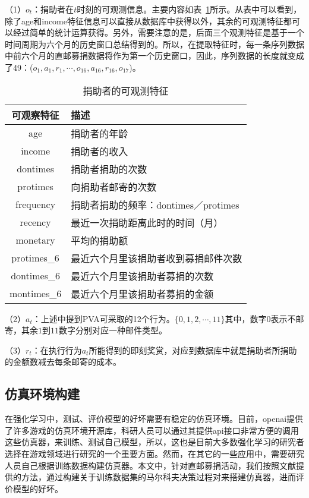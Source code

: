 （1）$o_{t}$：捐助者在$t$时刻的可观测信息。主要内容如表~\ref{tab:obser_donors}所示。从表中可以看到，除了age和income特征信息可以直接从数据库中获得以外，其余的可观测特征都可以经过简单的统计运算获得。另外，需要注意的是，后面三个观测特征是基于一个时间周期为六个月的历史窗口总结得到的。所以，在提取特征时，每一条序列数据中前六个月的直邮募捐数据将作为第一个历史窗口，因此，序列数据的长度就变成了49：($o_{1}, a_{1}, r_{1},\cdots,o_{16}, a_{16}, r_{16}, o_{17}$)。
\begin{table}[htbp]
  \centering
  \caption{捐助者的可观测特征}
  \label{tab:obser_donors}
  \begin{tabular}{cl}
    \toprule
      可观察特征 & 描述 \\
    \midrule
      age & 捐助者的年龄 \\
      income & 捐助者的收入 \\
      dontimes & 捐助者捐助的次数 \\
      protimes & 向捐助者邮寄的次数 \\
      frequency & 捐助者捐助的频率：dontimes／protimes\\
      recency & 最近一次捐助距离此时的时间（月） \\
      monetary & 平均的捐助额 \\
      protimes_6 & 最近六个月里该捐助者收到募捐邮件次数 \\
      dontimes_6 & 最近六个月里该捐助者募捐的次数 \\
      montimes_6 & 最近六个月里该捐助者募捐的金额 \\
    \bottomrule
  \end{tabular}
\end{table}

（2）$a_{t}$：上述中提到PVA可采取的12个行为。$\{0,1,2,\cdots,11\}$其中，数字$0$表示不邮寄，其余$1$到$11$数字分别对应一种邮件类型。

（3）$r_{t}$：在执行行为$a_{t}$所能得到的即刻奖赏，对应到数据库中就是捐助者所捐助的金额数减去每条邮寄的成本。

\subsection{仿真环境构建}
在强化学习中，测试、评价模型的好坏需要有稳定的仿真环境。目前，openai提供了许多游戏的仿真环境开源库，科研人员可以通过其提供api接口非常方便的调用这些仿真器，来训练、测试自己模型，所以，这也是目前大多数强化学习的研究者选择在游戏领域进行研究的一个重要方面。然而，在其它的一些应用中，需要研究人员自己根据训练数据构建仿真器。本文中，针对直邮募捐活动，我们按照文献\citep{pednault2002sequential}提供的方法，通过构建关于训练数据集的马尔科夫决策过程对来搭建仿真器，进而评价模型的好坏。

